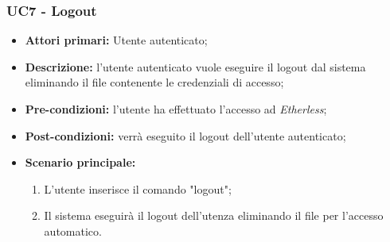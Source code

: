 \subsubsection{UC7 - Logout}
\begin{itemize}
	\item \textbf{Attori primari:} Utente autenticato;
	\item \textbf{Descrizione:} l'utente autenticato vuole eseguire il logout dal sistema eliminando il file contenente le credenziali di accesso; 
	\item \textbf{Pre-condizioni:} l'utente ha effettuato l'accesso ad \textit{Etherless};
	\item \textbf{Post-condizioni:} verrà eseguito il logout dell'utente autenticato;
	\item \textbf{Scenario principale:} 
	\begin{enumerate}
		\item L'utente inserisce il comando "logout";
		\item Il sistema eseguirà il logout dell'utenza eliminando il file per l'accesso automatico.
	\end{enumerate}
\end{itemize}